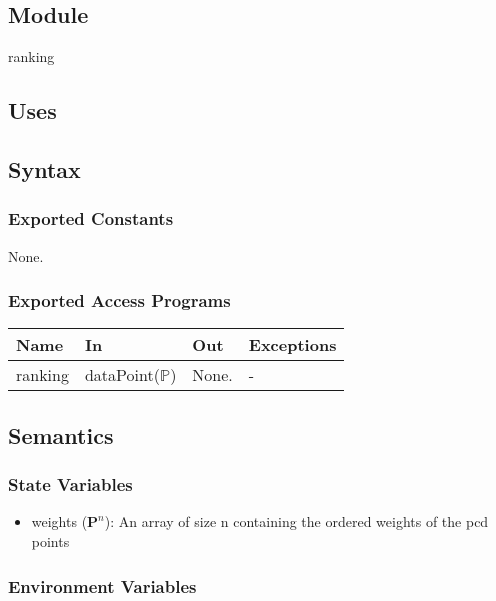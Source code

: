 \documentclass[12pt, titlepage]{article}
\begin{document}
\subsection{Module}

ranking

\subsection{Uses}

\subsection{Syntax}

\subsubsection{Exported Constants}

None.

\subsubsection{Exported Access Programs}

\begin{center}
\begin{tabular}{p{2cm} p{4cm} p{4cm} p{2cm}}
\hline
\textbf{Name} & \textbf{In} & \textbf{Out} & \textbf{Exceptions} \\
\hline
ranking & dataPoint($\mathbb{P}$)  & None. & - \\
\hline
\end{tabular}
\end{center}

\subsection{Semantics}

\subsubsection{State Variables}

\begin{itemize}
  \item weights ($\mathbf{P}^{n}$): An array of size n containing the ordered weights of the pcd points
\end{itemize}

\subsubsection{Environment Variables}
\end{document}
